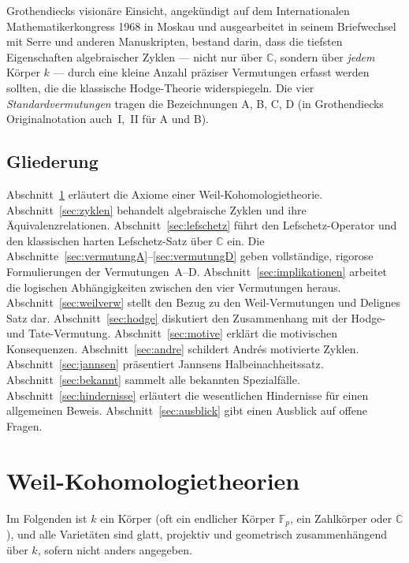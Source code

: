 \documentclass[12pt,a4paper]{amsart}
\theoremstyle{definition}
\newcommand{\C}{\mathbb{C}}
\newcommand{\Fp}{\mathbb{F}_p}
\begin{document}
Grothendiecks visionäre Einsicht, angekündigt auf dem Internationalen
Mathematikerkongress 1968 in Moskau und ausgearbeitet in seinem Briefwechsel
mit Serre und anderen Manuskripten, bestand darin, dass die tiefsten
Eigenschaften algebraischer Zyklen --- nicht nur über $\C$, sondern über
\emph{jedem} Körper $k$ --- durch eine kleine Anzahl präziser Vermutungen
erfasst werden sollten, die die klassische Hodge-Theorie widerspiegeln.
Die vier \emph{Standardvermutungen} tragen die Bezeichnungen A, B, C, D
(in Grothendiecks Originalnotation auch~I,~II für A und B).

\subsection*{Gliederung}

Abschnitt~\ref{sec:weil} erläutert die Axiome einer Weil-Kohomologietheorie.
Abschnitt~\ref{sec:zyklen} behandelt algebraische Zyklen und ihre Äquivalenzrelationen.
Abschnitt~\ref{sec:lefschetz} führt den Lefschetz-Operator und den klassischen
harten Lefschetz-Satz über $\C$ ein.
Die Abschnitte~\ref{sec:vermutungA}--\ref{sec:vermutungD} geben vollständige,
rigorose Formulierungen der Vermutungen~A--D.
Abschnitt~\ref{sec:implikationen} arbeitet die logischen Abhängigkeiten
zwischen den vier Vermutungen heraus.
Abschnitt~\ref{sec:weilverw} stellt den Bezug zu den Weil-Vermutungen und
Delignes Satz dar.
Abschnitt~\ref{sec:hodge} diskutiert den Zusammenhang mit der Hodge- und
Tate-Vermutung.
Abschnitt~\ref{sec:motive} erklärt die motivischen Konsequenzen.
Abschnitt~\ref{sec:andre} schildert Andrés motivierte Zyklen.
Abschnitt~\ref{sec:jannsen} präsentiert Jannsens Halbeinachheitssatz.
Abschnitt~\ref{sec:bekannt} sammelt alle bekannten Spezialfälle.
Abschnitt~\ref{sec:hindernisse} erläutert die wesentlichen Hindernisse
für einen allgemeinen Beweis.
Abschnitt~\ref{sec:ausblick} gibt einen Ausblick auf offene Fragen.

\section{Weil-Kohomologietheorien}\label{sec:weil}

Im Folgenden ist $k$ ein Körper (oft ein endlicher Körper $\Fp$, ein
Zahlkörper oder $\C$), und alle Varietäten sind glatt, projektiv und
geometrisch zusammenhängend über $k$, sofern nicht anders angegeben.
\end{document}

